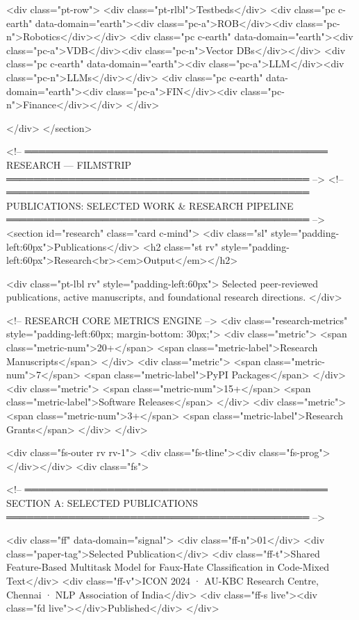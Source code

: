     <div class="pt-row">
      <div class="pt-rlbl">Testbeds</div>
      <div class="pc c-earth" data-domain="earth"><div class="pc-a">ROB</div><div class="pc-n">Robotics</div></div>
      <div class="pc c-earth" data-domain="earth"><div class="pc-a">VDB</div><div class="pc-n">Vector DBs</div></div>
      <div class="pc c-earth" data-domain="earth"><div class="pc-a">LLM</div><div class="pc-n">LLMs</div></div>
      <div class="pc c-earth" data-domain="earth"><div class="pc-a">FIN</div><div class="pc-n">Finance</div></div>
    </div>

  </div>
</section>

<!-- ════════════════════════════════════════════
     RESEARCH — FILMSTRIP
════════════════════════════════════════════ -->
<!-- ════════════════════════════════════════════
     PUBLICATIONS: SELECTED WORK & RESEARCH PIPELINE
════════════════════════════════════════════ -->
<section id="research" class="card c-mind">
  <div class="sl" style="padding-left:60px">Publications</div>
  <h2 class="st rv" style="padding-left:60px">Research<br><em>Output</em></h2>
  
  <div class="pt-lbl rv" style="padding-left:60px">
    Selected peer-reviewed publications, active manuscripts, and foundational research directions.
  </div>

  <!-- RESEARCH CORE METRICS ENGINE -->
  <div class="research-metrics" style="padding-left:60px; margin-bottom: 30px;">
    <div class="metric">
      <span class="metric-num">20+</span>
      <span class="metric-label">Research Manuscripts</span>
    </div>
    <div class="metric">
      <span class="metric-num">7</span>
      <span class="metric-label">PyPI Packages</span>
    </div>
    <div class="metric">
      <span class="metric-num">15+</span>
      <span class="metric-label">Software Releases</span>
    </div>
    <div class="metric">
      <span class="metric-num">3+</span>
      <span class="metric-label">Research Grants</span>
    </div>
  </div>

  <div class="fs-outer rv rv-1">
    <div class="fs-tline"><div class="fs-prog"></div></div>
    <div class="fs">
      
      <!-- ════════════════════════════════════════════
           SECTION A: SELECTED PUBLICATIONS
      ════════════════════════════════════════════ -->
      
      <div class="ff" data-domain="signal">
        <div class="ff-n">01</div>
        <div class="paper-tag">Selected Publication</div>
        <div class="ff-t">Shared Feature-Based Multitask Model for Faux-Hate Classification in Code-Mixed Text</div>
        <div class="ff-v">ICON 2024 · AU-KBC Research Centre, Chennai · NLP Association of India</div>
        <div class="ff-s live"><div class="fd live"></div>Published</div>
      </div>

